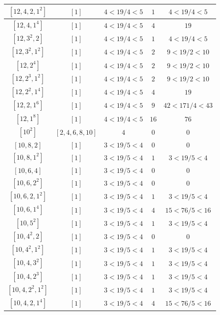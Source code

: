 \documentclass{article}%
\begin{document}
\begin{center}
\begin{longtable}{||c|c|c|c|c||}
$[12, 4, 2, 1^{2}]$ & $[1]$ & $4 < 19/4 < 5$ & $1$ & $4 < 19/4 < 5$ \\ \hline 
$[12, 4, 1^{4}]$ & $[1]$ & $4 < 19/4 < 5$ & $4$ & $19$ \\ \hline 
$[12, 3^{2}, 2]$ & $[1]$ & $4 < 19/4 < 5$ & $1$ & $4 < 19/4 < 5$ \\ \hline 
$[12, 3^{2}, 1^{2}]$ & $[1]$ & $4 < 19/4 < 5$ & $2$ & $9 < 19/2 < 10$ \\ \hline 
$[12, 2^{4}]$ & $[1]$ & $4 < 19/4 < 5$ & $2$ & $9 < 19/2 < 10$ \\ \hline 
$[12, 2^{3}, 1^{2}]$ & $[1]$ & $4 < 19/4 < 5$ & $2$ & $9 < 19/2 < 10$ \\ \hline 
$[12, 2^{2}, 1^{4}]$ & $[1]$ & $4 < 19/4 < 5$ & $4$ & $19$ \\ \hline 
$[12, 2, 1^{6}]$ & $[1]$ & $4 < 19/4 < 5$ & $9$ & $42 < 171/4 < 43$ \\ \hline 
$[12, 1^{8}]$ & $[1]$ & $4 < 19/4 < 5$ & $16$ & $76$ \\ \hline 
$[10^{2}]$ & $[2, 4, 6, 8, 10]$ & $4$ & $0$ & $0$ \\ \hline 
$[10, 8, 2]$ & $[1]$ & $3 < 19/5 < 4$ & $0$ & $0$ \\ \hline 
$[10, 8, 1^{2}]$ & $[1]$ & $3 < 19/5 < 4$ & $1$ & $3 < 19/5 < 4$ \\ \hline 
$[10, 6, 4]$ & $[1]$ & $3 < 19/5 < 4$ & $0$ & $0$ \\ \hline 
$[10, 6, 2^{2}]$ & $[1]$ & $3 < 19/5 < 4$ & $0$ & $0$ \\ \hline 
$[10, 6, 2, 1^{2}]$ & $[1]$ & $3 < 19/5 < 4$ & $1$ & $3 < 19/5 < 4$ \\ \hline 
$[10, 6, 1^{4}]$ & $[1]$ & $3 < 19/5 < 4$ & $4$ & $15 < 76/5 < 16$ \\ \hline 
$[10, 5^{2}]$ & $[1]$ & $3 < 19/5 < 4$ & $1$ & $3 < 19/5 < 4$ \\ \hline 
$[10, 4^{2}, 2]$ & $[1]$ & $3 < 19/5 < 4$ & $0$ & $0$ \\ \hline 
$[10, 4^{2}, 1^{2}]$ & $[1]$ & $3 < 19/5 < 4$ & $1$ & $3 < 19/5 < 4$ \\ \hline 
$[10, 4, 3^{2}]$ & $[1]$ & $3 < 19/5 < 4$ & $1$ & $3 < 19/5 < 4$ \\ \hline 
$[10, 4, 2^{3}]$ & $[1]$ & $3 < 19/5 < 4$ & $1$ & $3 < 19/5 < 4$ \\ \hline 
$[10, 4, 2^{2}, 1^{2}]$ & $[1]$ & $3 < 19/5 < 4$ & $1$ & $3 < 19/5 < 4$ \\ \hline 
$[10, 4, 2, 1^{4}]$ & $[1]$ & $3 < 19/5 < 4$ & $4$ & $15 < 76/5 < 16$ \\ \hline 

\end{longtable}
\end{center}
\end{document}

